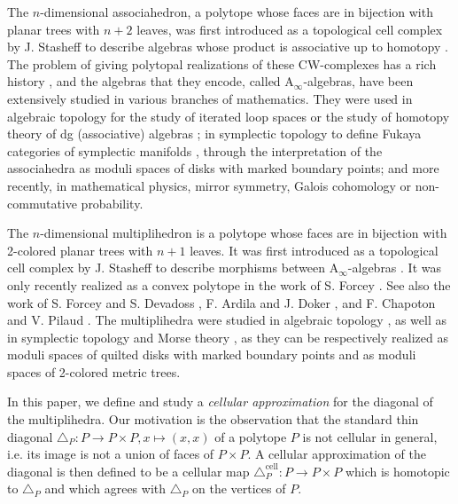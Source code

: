 \documentclass[twoside, 11pt]{amsart}
\theoremstyle{remark}
\begin{document}
The $n$-dimensional associahedron, a polytope whose faces are in bijection with planar trees with $n+2$ leaves, was first introduced as a topological cell complex by J. Stasheff to describe algebras whose product is associative up to homotopy \cite{Stasheff63}.
The problem of giving polytopal realizations of these CW-complexes has a rich history \cite{CeballosZiegler12}, and the algebras that they encode, called $\mathrm{A}_\infty$-algebras, have been extensively studied in various branches of mathematics. They were used in algebraic topology for the study of iterated loop spaces \cite{May72} or the study of homotopy theory of dg (associative) algebras \cite{LefevreHasegawa03,Vallette14} ; in symplectic topology to define Fukaya categories of symplectic manifolds \cite{Seidel08,fo3-I,fo3-II}, through the interpretation of the associahedra as moduli spaces of disks with marked boundary points; and more recently, in mathematical physics, mirror symmetry, Galois cohomology or non-commutative probability.

\medskip

The $n$-dimensional multiplihedron is a polytope whose faces are in bijection with 2-colored planar trees with $n+1$ leaves. It was first introduced as a topological cell complex by J. Stasheff to describe morphisms between $\mathrm{A}_\infty$-algebras \cite{Stasheff70}.
It was only recently realized as a convex polytope in the work of S. Forcey \cite{Forcey08}. See also the work of S. Forcey and S. Devadoss \cite{DevadossForcey08}, F. Ardila and J. Doker \cite{AD13}, and F. Chapoton and V. Pilaud \cite{CP22}.
The multiplihedra were studied in algebraic topology \cite{BoardmanVogt73}, as well as in symplectic topology \cite{MauWoodward10,mau-wehrheim-woodward} and Morse theory \cite{mazuir-I,mazuir-II}, as they can be respectively realized as moduli spaces of quilted disks with marked boundary points and as moduli spaces of 2-colored metric trees. 

\medskip

In this paper, we define and study a \textit{cellular approximation} for the diagonal of the multiplihedra. 
Our motivation is the observation that the standard thin diagonal $\triangle_P:P\to P\times P, x\mapsto (x,x)$ of a polytope $P$ is not cellular in general, i.e. its image is not a union of faces of $P\times P$. 
A cellular approximation of the diagonal is then defined to be a cellular map $\triangle_P^{\textrm{cell}} : P \to P\times P$ which is homotopic to $\triangle_P$ and which agrees with $\triangle_P$ on the vertices of $P$.
\end{document}
